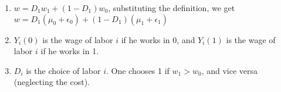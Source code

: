 \begin{enumerate}
    \item 
    
    $w = D_1 w_1 + (1-D_1)w_0$, substituting the definition, we get $w = D_1 (\mu_0 + \epsilon_0) + (1-D_1)(\mu_1 + \epsilon_1) $

    \item $Y_i(0)$ is the wage of labor $i$ if he works in 0, and $Y_i(1)$ is the wage of labor $i$ if he works in 1.
    \item $D_i$ is the choice of labor $i$. 
    One chooses 1 if $w_1 > w_0$, 
    and vice versa (neglecting the cost).
\end{enumerate}